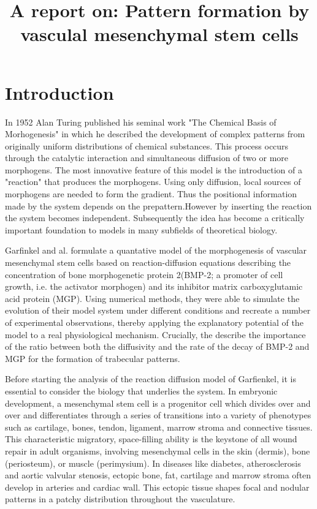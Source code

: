 \documentclass[12pt]{article}
\title{A report on: Pattern formation by vasculal mesenchymal stem cells}
\date{\vspace{-5ex}}
\begin{document}
	
	\maketitle
	
	\section{Introduction}
	
  In 1952 Alan Turing published his seminal work "The Chemical Basis of Morhogenesis" in which he described the development of complex patterns from originally uniform distributions of chemical substances. This process occurs through the catalytic interaction and simultaneous diffusion of two or more morphogens. The most innovative feature of this model is the introduction of a "reaction" that produces the morphogens. Using only diffusion, local sources of morphogens are needed to form the gradient. Thus the positional information made by the system depends on the prepattern.However by inserting the reaction the system becomes independent. Subsequently the idea has become a critically important foundation to models in many subfields of theoretical biology.
  
  Garfinkel and al. formulate a quantative model of the morphogenesis of vascular mesenchymal stem cells based on reaction-diffusion equations describing the concentration of bone morphogenetic protein 2(BMP-2; a promoter of cell growth, i.e. the activator morphogen) and its inhibitor matrix carboxyglutamic acid protein (MGP). Using numerical methods, they were able to simulate the evolution of their model system under different conditions and recreate a number of experimental observations, thereby applying the explanatory potential of the model to a real physiological mechanism. Crucially, the describe the importance of the ratio between both the diffusivity and the rate of the decay of BMP-2 and MGP for the formation of trabecular patterns. 
  
  Before starting the analysis of the reaction diffusion model of Garfienkel, it is essential to consider the biology that underlies the system. 
  In embryonic development, a mesenchymal stem cell is a progenitor cell which divides over and over and differentiates through a series of transitions into a variety of phenotypes such as cartilage, bones, tendon, ligament, marrow stroma and connective tissues.
  This characteristic migratory, space-filling ability is the keystone of all wound repair in adult organisms, involving mesenchymal cells in the skin (dermis), bone (periosteum), or muscle (perimysium). In diseases like diabetes, atherosclerosis and aortic valvular stenosis, ectopic bone, fat, cartilage and marrow stroma often develop in arteries and cardiac wall. This ectopic tissue shapes focal and nodular patterns in a patchy distribution throughout the vasculature. 
  
\end{document}
